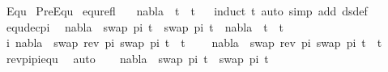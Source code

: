 %
\begin{isabellebody}%
%
%
\isadelimtheory
%
\endisadelimtheory
%
\isatagtheory
{}\isamarkupfalse%
\ Equ\isanewline
\isanewline
{}\ PreEqu\isanewline
\isanewline
{}%
\endisatagtheory
{\isafoldtheory}%
%
\isadelimtheory
\isanewline
%
\endisadelimtheory
\isanewline
{}\isamarkupfalse%
\ equ{\isacharunderscore}{\kern0pt}refl{\isacharcolon}{\kern0pt}\ \isanewline
\ \ {\isachardoublequoteopen}nabla\ {\isasymturnstile}\ t\ {\isasymapprox}\ t{\isachardoublequoteclose}\isanewline
%
\isadelimproof
\ \ %
\endisadelimproof
%
\isatagproof
{}\isamarkupfalse%
{\isacharparenleft}{\kern0pt}induct\ t{\isacharcomma}{\kern0pt}\ auto\ simp\ add{\isacharcolon}{\kern0pt}\ ds{\isacharunderscore}{\kern0pt}def{\isacharparenright}{\kern0pt}%
\endisatagproof
{\isafoldproof}%
%
\isadelimproof
\isanewline
%
\endisadelimproof
\isanewline
\isanewline
{}\isamarkupfalse%
\ equ{\isacharunderscore}{\kern0pt}dec{\isacharunderscore}{\kern0pt}pi{\isacharcolon}{\kern0pt}\isanewline
\ \ {\isachardoublequoteopen}nabla\ {\isasymturnstile}\ swap\ pi\ t{}\ {\isasymapprox}\ swap\ pi\ t{}\ {\isasymLongrightarrow}\ nabla\ {\isasymturnstile}\ t{}\ {\isasymapprox}\ t{}{\isachardoublequoteclose}\isanewline
%
\isadelimproof
%
\endisadelimproof
%
\isatagproof
{}\isamarkupfalse%
{\isacharminus}{\kern0pt}\isanewline
\ \ \isamarkupfalse%
\ i{\isacharcolon}{\kern0pt}\ {\isachardoublequoteopen}nabla\ {\isasymturnstile}\ swap\ {\isacharparenleft}{\kern0pt}rev\ pi{\isacharparenright}{\kern0pt}\ {\isacharparenleft}{\kern0pt}swap\ pi\ t{}{\isacharparenright}{\kern0pt}\ {\isasymapprox}\ t{}{\isachardoublequoteclose}\isanewline
\ \ \ \ {\isachardoublequoteopen}nabla\ {\isasymturnstile}\ swap\ {\isacharparenleft}{\kern0pt}rev\ pi{\isacharparenright}{\kern0pt}\ {\isacharparenleft}{\kern0pt}swap\ pi\ t{}{\isacharparenright}{\kern0pt}\ {\isasymapprox}\ t{}{\isachardoublequoteclose}\isanewline
\ \ \ \ \isamarkupfalse%
\ rev{\isacharunderscore}{\kern0pt}pi{\isacharunderscore}{\kern0pt}pi{\isacharunderscore}{\kern0pt}equ\ \isamarkupfalse%
\ auto\isanewline
\ \ \isamarkupfalse%
\ {\isachardoublequoteopen}nabla\ {\isasymturnstile}\ swap\ pi\ t{}\ {\isasymapprox}\ swap\ pi\ t{}{\isachardoublequoteclose}\isanewline
\ \ \isamarkupfalse%
\ \isamarkupfalse%

\end{isabellebody}
